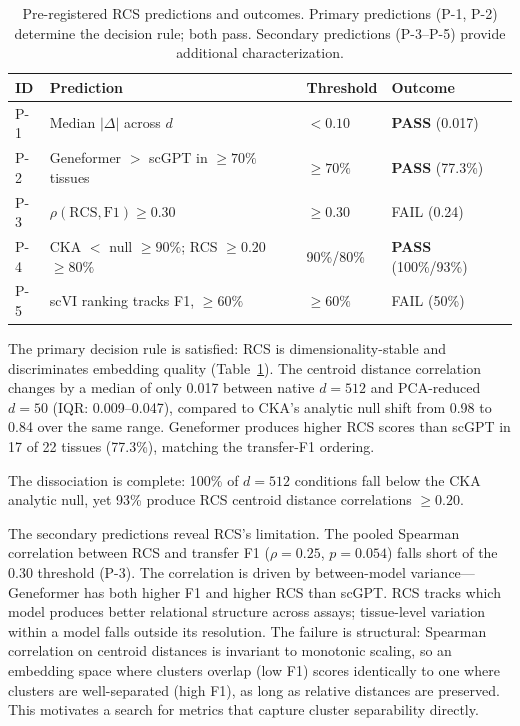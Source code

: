 \documentclass[11pt]{article}
\begin{document}
\begin{table}[t]
\centering
\caption{Pre-registered RCS predictions and outcomes. Primary
predictions (P-1, P-2) determine the decision rule; both pass.
Secondary predictions (P-3--P-5) provide additional characterization.}
\label{tab:scgraph}
\small
\begin{tabular}{@{}lp{5.5cm}ll@{}}
\toprule
ID & Prediction & Threshold & Outcome \\
\midrule
P-1 & Median $|\Delta|$ across $d$ & $< 0.10$ & \textbf{PASS} (0.017) \\
P-2 & Geneformer $>$ scGPT in $\geq 70\%$ tissues & $\geq 70\%$ & \textbf{PASS} (77.3\%) \\
\midrule
P-3 & $\rho(\text{RCS}, \text{F1}) \geq 0.30$ & $\geq 0.30$ & FAIL (0.24) \\
P-4 & CKA $<$ null $\geq 90\%$; RCS $\geq 0.20$ $\geq 80\%$ & 90\%/80\% & \textbf{PASS} (100\%/93\%) \\
P-5 & scVI ranking tracks F1, $\geq 60\%$ & $\geq 60\%$ & FAIL (50\%) \\
\bottomrule
\end{tabular}
\end{table}

The primary decision rule is satisfied: RCS is dimensionality-stable
and discriminates embedding quality (Table~\ref{tab:scgraph}). The
centroid distance correlation changes by a median of only 0.017
between native $d = 512$ and PCA-reduced $d = 50$ (IQR: 0.009--0.047),
compared to CKA's analytic null shift from 0.98 to 0.84 over the same
range. Geneformer produces higher RCS scores than scGPT in 17 of
22 tissues (77.3\%), matching the transfer-F1 ordering.

The dissociation is complete: 100\% of $d = 512$ conditions fall below
the CKA analytic null, yet 93\% produce RCS centroid distance
correlations $\geq 0.20$.

The secondary predictions reveal RCS's limitation. The pooled Spearman
correlation between RCS and transfer F1 ($\rho = 0.25$, $p = 0.054$)
falls short of the 0.30 threshold (P-3). The correlation is driven by
between-model variance---Geneformer has both higher F1 and higher RCS
than scGPT. RCS tracks which model produces better relational structure
across assays; tissue-level variation within a model falls outside its
resolution. The failure is structural: Spearman correlation on centroid
distances is invariant to monotonic scaling, so an embedding space where
clusters overlap (low F1) scores identically to one where clusters are
well-separated (high F1), as long as relative distances are preserved.
This motivates a search for metrics that capture cluster separability
directly.
\end{document}
